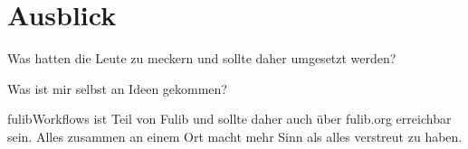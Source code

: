 \chapter{Ausblick}\label{ch:ausblick}


Was hatten die Leute zu meckern und sollte daher umgesetzt werden?

Was ist mir selbst an Ideen gekommen?


fulibWorkflows ist Teil von Fulib und sollte daher auch über fulib.org erreichbar sein.
Alles zusammen an einem Ort macht mehr Sinn als alles verstreut zu haben.
